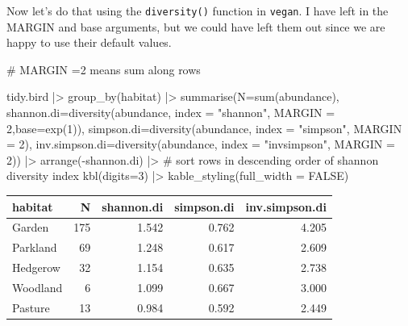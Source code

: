 \documentclass[
  letterpaper,
  DIV=11,
  numbers=noendperiod]{scrreprt}
\newenvironment{Shaded}{\begin{snugshade}}{\end{snugshade}}
\newcommand{\AttributeTok}[1]{\textcolor[rgb]{0.40,0.45,0.13}{#1}}
\newcommand{\CommentTok}[1]{\textcolor[rgb]{0.37,0.37,0.37}{#1}}
\newcommand{\ConstantTok}[1]{\textcolor[rgb]{0.56,0.35,0.01}{#1}}
\newcommand{\DecValTok}[1]{\textcolor[rgb]{0.68,0.00,0.00}{#1}}
\newcommand{\FunctionTok}[1]{\textcolor[rgb]{0.28,0.35,0.67}{#1}}
\newcommand{\NormalTok}[1]{\textcolor[rgb]{0.00,0.23,0.31}{#1}}
\newcommand{\SpecialCharTok}[1]{\textcolor[rgb]{0.37,0.37,0.37}{#1}}
\newcommand{\StringTok}[1]{\textcolor[rgb]{0.13,0.47,0.30}{#1}}
\begin{document}
Now let's do that using the \texttt{diversity()} function in
\texttt{vegan}. I have left in the MARGIN and base arguments, but we
could have left them out since we are happy to use their default values.

\begin{Shaded}
\begin{Highlighting}[]
\CommentTok{\# MARGIN =2 means sum along rows}

\NormalTok{tidy.bird }\SpecialCharTok{|\textgreater{}}
  \FunctionTok{group\_by}\NormalTok{(habitat) }\SpecialCharTok{|\textgreater{}}
  \FunctionTok{summarise}\NormalTok{(}\AttributeTok{N=}\FunctionTok{sum}\NormalTok{(abundance),}
            \AttributeTok{shannon.di=}\FunctionTok{diversity}\NormalTok{(abundance, }\AttributeTok{index =} \StringTok{"shannon"}\NormalTok{, }\AttributeTok{MARGIN =} \DecValTok{2}\NormalTok{,}\AttributeTok{base=}\FunctionTok{exp}\NormalTok{(}\DecValTok{1}\NormalTok{)),}
            \AttributeTok{simpson.di=}\FunctionTok{diversity}\NormalTok{(abundance, }\AttributeTok{index =} \StringTok{"simpson"}\NormalTok{, }\AttributeTok{MARGIN =} \DecValTok{2}\NormalTok{),}
            \AttributeTok{inv.simpson.di=}\FunctionTok{diversity}\NormalTok{(abundance, }\AttributeTok{index =} \StringTok{"invsimpson"}\NormalTok{, }\AttributeTok{MARGIN =} \DecValTok{2}\NormalTok{)) }\SpecialCharTok{|\textgreater{}}
  \FunctionTok{arrange}\NormalTok{(}\SpecialCharTok{{-}}\NormalTok{shannon.di) }\SpecialCharTok{|\textgreater{}} \CommentTok{\# sort rows in descending order of shannon diversity index}
  \FunctionTok{kbl}\NormalTok{(}\AttributeTok{digits=}\DecValTok{3}\NormalTok{) }\SpecialCharTok{|\textgreater{}}
  \FunctionTok{kable\_styling}\NormalTok{(}\AttributeTok{full\_width =} \ConstantTok{FALSE}\NormalTok{)}
\end{Highlighting}
\end{Shaded}

\begin{table}
\centering
\begin{tabular}[t]{l|r|r|r|r}
\hline
habitat & N & shannon.di & simpson.di & inv.simpson.di\\
\hline
Garden & 175 & 1.542 & 0.762 & 4.205\\
\hline
Parkland & 69 & 1.248 & 0.617 & 2.609\\
\hline
Hedgerow & 32 & 1.154 & 0.635 & 2.738\\
\hline
Woodland & 6 & 1.099 & 0.667 & 3.000\\
\hline
Pasture & 13 & 0.984 & 0.592 & 2.449\\
\hline
\end{tabular}
\end{table}
\end{document}

